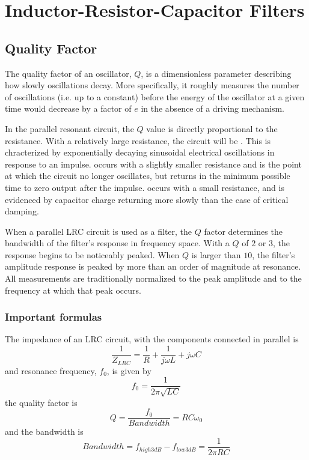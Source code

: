 \chapter{Inductor-Resistor-Capacitor Filters}

\section{Quality Factor}

The quality factor of an oscillator, $Q$, is a dimensionless parameter describing how slowly oscillations decay. More specifically, it roughly measures the number of oscillations (i.e. up to a constant) before the energy of the oscillator at a given time would decrease by a factor of $e$ in the absence of a driving mechanism. 

In the parallel resonant circuit, the $Q$ value is directly proportional to the resistance. With a relatively large resistance, the circuit will be . This is chracterized by exponentially decaying sinusoidal electrical oscillations in response to an impulse.  occurs with a slightly smaller resistance and is the point at which the circuit no longer oscillates, but returns in the minimum possible time to zero output after the impulse.  occurs with a small resistance, and is evidenced by capacitor charge returning more slowly than the case of critical damping.

When a parallel LRC circuit is used as a filter, the $Q$ factor determines the bandwidth of the filter's response in frequency space. With a $Q$ of $2$ or $3$, the response begins to be noticeably peaked. When $Q$ is larger than $10$, the filter's amplitude response is peaked by more than an order of magnitude at resonance. All measurements are traditionally normalized to the peak amplitude and to the frequency at which that peak occurs.

\subsection{Important formulas}

The impedance of an LRC circuit, with the components connected in parallel is \begin{equation*}
    \frac{1}{Z_{LRC}} = \frac{1}{R}  + \frac{1}{j\omega L} + j\omega C
\end{equation*}
and resonance frequency, $f_0$, is given by \begin{equation*}
    f_0 = \frac{1}{2\pi \sqrt{LC}}
\end{equation*}
the quality factor is \begin{equation*}
    Q = \frac{f_0}{Bandwidth} = RC\omega_0
\end{equation*}
and the bandwidth is \begin{equation*}
    Bandwidth = f_{high3dB} - f_{low3dB} = \frac{1}{2\pi RC}
\end{equation*}



